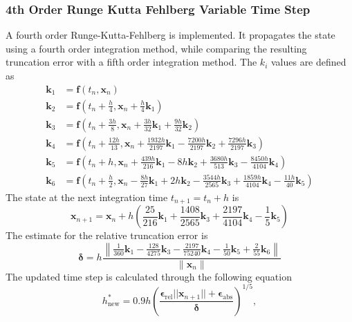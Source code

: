 \subsubsection{4th Order Runge Kutta Fehlberg Variable Time Step}
A fourth order Runge-Kutta-Fehlberg is implemented. It propagates the state using a fourth order integration method, while comparing the resulting truncation error with a fifth order integration method. The $k_i$ values are defined as
\begin{align}
	\bm k_1 &= \bm f\left(t_{n}, \bm x_{n}\right) \label{eq:k1_RKF45}\\
	\bm k_2 &= \bm f\left(t_{n} + \frac{h}{4}, \bm x_{n} + \frac{h}{4} \bm k_1\right) \\
	\bm k_3 &= \bm f\left(t_{n} + \frac{3h}{8}, \bm x_{n} + \frac{3h}{32} \bm k_1 + \frac{9h}{32} \bm k_2\right) \\
	\bm k_4 &= \bm f\left(t_{n} + \frac{12h}{13}, \bm x_{n} + \frac{1932h}{2197} \bm k_1 - \frac{7200h}{2197} \bm k_2 + \frac{7296h}{2197} \bm k_3\right) \\
	\bm k_5 &= \bm f\left(t_{n} + h, \bm x_{n} + \frac{439h}{216} \bm k_1 - 8h \bm k_2 + \frac{3680h}{513} \bm k_3 - \frac{8450h}{4104} \bm k_4\right) \\
	\bm k_6 &= \bm f\left(t_{n} + \frac{h}{2}, \bm x_{n} - \frac{8h}{27} \bm k_1 + 2h \bm k_2 - \frac{3544h}{2565} \bm k_3 + \frac{1859h}{4104} \bm k_4 - \frac{11h}{40} \bm k_5\right) \label{eq:k6_RKF45}
\end{align}
The state at the next integration time $t_{n+1} = t_{n} + h$ is
\begin{equation}
	\bm x_{n+1} = \bm x_{n} + h \left(
		\frac{25}{216} \bm k_{1} + \frac{1408}{2565} \bm k_{3} + \frac{2197}{4104} \bm k_{4} - \frac{1}{5} \bm k_{5} \label{eq:PropagateState_RKF45}
	\right)
\end{equation}
The estimate for the relative truncation error is
\begin{equation}
	\bm \delta = h\frac{\left\|
		\frac{1}{360} \bm k_{1} - \frac{128}{4275} \bm k_{3} - \frac{2197}{75240} \bm k_{4} - \frac{1}{50} \bm k_{5} + \frac{2}{55} \bm k_{6} \label{eq:Error_RKF45}
	\right\|}{\|\bm x_n\|}
\end{equation}
The updated time step is calculated through the following equation
\begin{equation}
	h_{\text{new}}^*=0.9h\left(\frac{\bm \epsilon_{\text{rel}}||\bm x_{n+1}|| + \bm \epsilon_{\text{abs}}}{\bm \delta}\right)^{1/5}, \label{eq:h_RKF45}
\end{equation}
